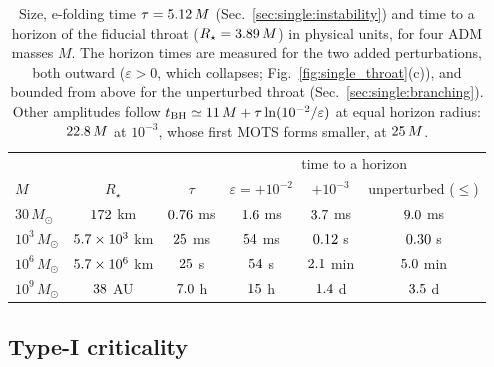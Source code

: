 \documentclass[twocolumn,floatfix,aps,prd,superscriptaddress,nofootinbib]{revtex4-2}
\begin{document}
\begin{table}[t]
\caption{Size, e-folding time $\tau=5.12\,M$ (Sec.~\ref{sec:single:instability}) and time to a horizon of the fiducial throat ($R_\star=3.89\,M$) in physical units, for four ADM masses $M$. The horizon times are measured for the two added perturbations, both outward ($\varepsilon>0$, which collapses; Fig.~\ref{fig:single_throat}(c)), and bounded from above for the unperturbed throat (Sec.~\ref{sec:single:branching}). Other amplitudes follow $t_{\rm BH}\simeq11\,M+\tau\ln(10^{-2}/\varepsilon)$ at equal horizon radius: $22.8\,M$ at $10^{-3}$, whose first MOTS forms smaller, at $25\,M$.}
\label{tab:scales}
\scriptsize
\begin{ruledtabular}
\begin{tabular}{lccccc}
 & & & \multicolumn{3}{c}{time to a horizon} \\
$M$ & $R_\star$ & $\tau$ & $\varepsilon=+10^{-2}$ & $+10^{-3}$ & unperturbed ($\le$) \\
\hline
$30\,M_\odot$ & $172$ km & $0.76$ ms & $1.6$ ms & $3.7$ ms & $9.0$ ms \\
$10^{3}\,M_\odot$ & $5.7\times10^{3}$ km & $25$ ms & $54$ ms & $0.12$ s & $0.30$ s \\
$10^{6}\,M_\odot$ & $5.7\times10^{6}$ km & $25$ s & $54$ s & $2.1$ min & $5.0$ min \\
$10^{9}\,M_\odot$ & $38$ AU & $7.0$ h & $15$ h & $1.4$ d & $3.5$ d \\
\end{tabular}
\end{ruledtabular}
\end{table}

\subsection{Type-I criticality}
\label{sec:single:critical}
\end{document}
